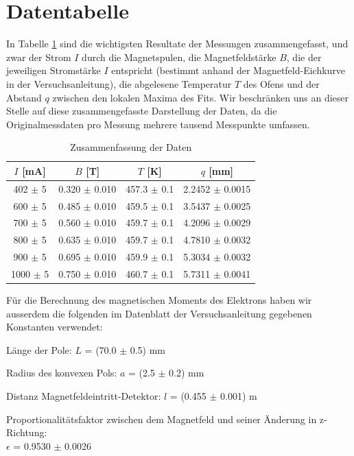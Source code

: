 \documentclass[a4paper,parskip,11pt, DIV12]{scrreprt}
\begin{document}
\section{Datentabelle}
In Tabelle \ref{tabelle1} sind die wichtigsten Resultate der Messungen zusammengefasst, und zwar der Strom $I$ durch die Magnetspulen, die Magnetfeldstärke $B$, die der jeweiligen Stromstärke $I$ entspricht (bestimmt anhand der Magnetfeld-Eichkurve in der Versuchsanleitung), die abgelesene Temperatur $T$ des Ofens und der Abstand $q$ zwischen den lokalen Maxima des Fits. Wir beschränken uns an dieser Stelle auf diese zusammengefasste Darstellung der Daten, da die Originalmessdaten pro Messung mehrere tausend Messpunkte umfassen. \\

\begin{table}[H]
\centering
\renewcommand{\arraystretch}{1.2} %
\setlength{\tabcolsep}{3mm} %
\begin{tabular}{|c|c|c|c|} 
$I$ [mA] & $B$ [T] & $T$ [K]  & $q$ [mm]\\ \hline
402   $\pm$ 5      & 0.320   $\pm$ 0.010   & 457.3  $\pm$ 0.1   & 2.2452 $\pm$ 0.0015 \\
600    $\pm$ 5      & 0.485   $\pm$ 0.010   & 459.5  $\pm$ 0.1   &3.5437  $\pm$ 0.0025\\
700    $\pm$ 5      & 0.560   $\pm$ 0.010  & 459.7   $\pm$ 0.1   &4.2096  $\pm$ 0.0029\\
800    $\pm$ 5     & 0.635    $\pm$ 0.010 & 459.7    $\pm$ 0.1   & 4.7810 $\pm$  0.0032 \\
900    $\pm$ 5     & 0.695    $\pm$ 0.010 & 459.9    $\pm$ 0.1    &5.3034  $\pm$  0.0032 \\
1000    $\pm$ 5    & 0.750     $\pm$ 0.010 & 460.7       $\pm$ 0.1 &5.7311  $\pm$ 0.0041
\end{tabular}
\caption[Daten]{Zusammenfassung der Daten}\label{tabelle1}
\end{table} Für die Berechnung des magnetischen Moments des Elektrons haben wir ausserdem die folgenden im Datenblatt der Versuchsanleitung gegebenen Konstanten verwendet:

Länge der Pole:
$L$ = (70.0 $\pm$ 0.5) mm

Radius des konvexen Pols:
$a$ = (2.5 $\pm$ 0.2) mm

Distanz Magnetfeldeintritt-Detektor:
$l$ = (0.455 $\pm$ 0.001) m

Proportionalitätsfaktor zwischen dem Magnetfeld und seiner Änderung in z-Richtung:\\
$\epsilon$ = 0.9530 $\pm$ 0.0026
\end{document}
